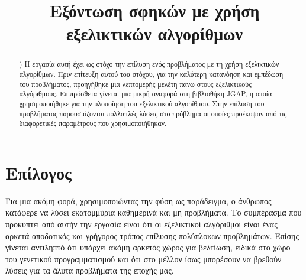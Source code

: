 \documentclass[conference]{IEEEtran}
\begin{document}
\title{Εξόντωση σφηκών με χρήση εξελικτικών αλγορίθμων}


\author{
\and
{}
}

\maketitle

\begin{abstract})
Η εργασία αυτή έχει ως στόχο την επίλυση ενός προβλήματος με τη χρήση εξελικτικών αλγορίθμων. Πριν επίτευξη αυτού του στόχου, για την καλύτερη κατανόηση και εμπέδωση του προβλήματος, προηγήθηκε μια λεπτομερής μελέτη πάνω στους εξελικτικούς αλγόριθμους. Επιπρόσθετα γίνεται μια μικρή αναφορά στη βιβλιοθήκη JGAP, η οποία χρησιμοποιήθηκε για την υλοποίηση του εξελικτικού αλγορίθμου. Στην επίλυση του προβλήματος παρουσιάζονται πολλαπλές λύσεις στο πρόβλημα οι οποίες προέκυψαν από τις διαφορετικές παραμέτρους που χρησιμοποιήθηκαν.
\end{abstract}


%
\IEEEpeerreviewmaketitle







\section{Επίλογος}

Για μια ακόμη φορά, χρησιμοποιώντας την φύση ως παράδειγμα, ο άνθρωπος κατάφερε να λύσει εκατομμύρια καθημερινά και μη προβλήματα. Το συμπέρασμα που προκύπτει από αυτήν την εργασία είναι ότι οι εξελικτικοί αλγόριθμοι είναι ένας αρκετά αποδοτικός και γρήγορος τρόπος επίλυσης πολύπλοκων προβλημάτων. Επίσης γίνεται αντιληπτό ότι υπάρχει ακόμη αρκετός χώρος για βελτίωση, ειδικά στο χώρο του γενετικού προγραμματισμού και ότι στο μέλλον ίσως μπορέσουν να βρεθούν λύσεις για τα άλυτα προβλήματα της εποχής μας.


\begingroup
\raggedright
\printbibliography
\endgroup
\end{document}
